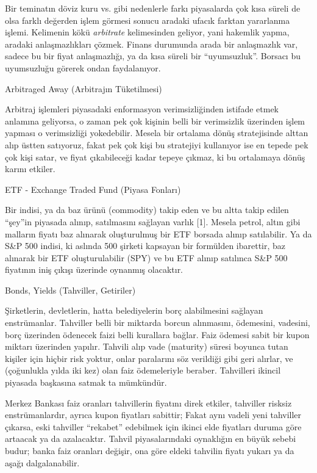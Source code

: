 \documentclass[12pt,fleqn]{article}\usepackage{../../common}
\begin{document}
Bir teminatın döviz kuru vs. gibi nedenlerle farkı piyasalarda çok kısa
süreli de olsa farklı değerden işlem görmesi sonucu aradaki ufacık farktan
yararlanma işlemi. Kelimenin kökü {\em arbitrate} kelimesinden geliyor,
yani hakemlik yapma, aradaki anlaşmazlıkları çözmek. Finans durumunda arada
bir anlaşmazlık var, sadece bu bir fiyat anlaşmazlığı, ya da kısa süreli
bir ``uyumsuzluk''. Borsacı bu uyumsuzluğu görerek ondan faydalanıyor.

Arbitraged Away (Arbitrajın Tüketilmesi)

Arbitraj işlemleri piyasadaki enformasyon verimsizliğinden istifade etmek
anlamına geliyorsa, o zaman pek çok kişinin belli bir verimsizlik üzerinden
işlem yapması o verimsizliği yokedebilir. Mesela bir ortalama dönüş
stratejisinde alttan alıp üstten satıyoruz, fakat pek çok kişi bu
stratejiyi kullanıyor ise en tepede pek çok kişi satar, ve fiyat
çıkabileceği kadar tepeye çıkmaz, ki bu ortalamaya dönüş karını etkiler.

ETF - Exchange Traded Fund (Piyasa Fonları)

Bir indisi, ya da baz ürünü (commodity) takip eden ve bu altta takip edilen
``şey''in piyasada alınıp, satılmasını sağlayan varlık [1]. Mesela petrol,
altın gibi malların fiyatı baz alınarak oluşturulmuş bir ETF borsada alınıp
satılabilir. Ya da S\&P 500 indisi, ki aslında 500 şirketi kapsayan bir
formülden ibarettir, baz alınarak bir ETF oluşturulabilir (SPY) ve bu ETF
alınıp satılınca S\&P 500 fiyatının iniş çıkışı üzerinde oynanmış
olacaktır. 

Bonds, Yields (Tahviller, Getiriler)

Şirketlerin, devletlerin, hatta belediyelerin borç alabilmesini sağlayan
enstrümanlar. Tahviller belli bir miktarda borcun alınmasını, ödemesini,
vadesini, borç üzerinden ödenecek faizi belli kurallara bağlar. Faiz ödemesi
sabit bir kupon miktarı üzerinden yapılır. Tahvili alıp vade (maturity) süresi
boyunca tutan kişiler için hiçbir risk yoktur, onlar paralarını söz verildiği
gibi geri alırlar, ve (çoğunlukla yılda iki kez) olan faiz ödemeleriyle
beraber. Tahvilleri ikincil piyasada başkasına satmak ta mümkündür. 

Merkez Bankası faiz oranları tahvillerin fiyatını direk etkiler, tahviller
risksiz enstrümanlardır, ayrıca kupon fiyatları sabittir; Fakat aynı vadeli yeni
tahviller çıkarsa, eski tahviller ``rekabet'' edebilmek için ikinci elde
fiyatları duruma göre artaacak ya da azalacaktır. Tahvil piyasalarındaki
oynaklığın en büyük sebebi budur; banka faiz oranları değişir, ona göre eldeki
tahvilin fiyatı yukarı ya da aşağı dalgalanabilir.
\end{document}
